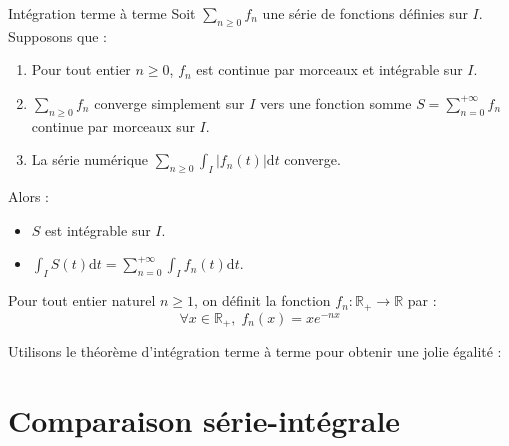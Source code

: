 \documentclass[french,11pt,twoside]{VcCours}
\newcommand{\dt}{\text{d}t}
\newcommand{\Sum}[2]{\sum_{#1}^{#2}}
\begin{document}
\begin{Theoreme}{Intégration terme à terme}
Soit $\Sum{n \geq 0}{} f_n$ une série de fonctions définies sur $I$. Supposons que :
\begin{enumerate}
\item Pour tout entier $n \geq 0$, $f_n$ est continue par morceaux et intégrable sur $I$.
\item $\Sum{n \geq 0}{} f_n$ converge simplement sur $I$ vers une fonction somme $S=\Sum{n=0}{+\infty} f_n$ continue par morceaux sur $I$.
\item La série numérique $ \Sum{n \geq 0}{} \int_{I} \vert f_n(t) \vert \dt$ converge.
\end{enumerate}
Alors :
\begin{itemize}
\item $S$ est intégrable sur $I$.
\item $\int_{I} S(t) \dt =  \Sum{n=0}{+\infty} \int_{I} f_n(t) \dt$.
\end{itemize}
\end{Theoreme}

\begin{Exemple} Pour tout entier naturel $n \geq 1$, on définit la fonction $f_n : \mathbb{R}_+ \rightarrow \mathbb{R}$ par :
$$ \forall x \in \mathbb{R}_+, \; f_n(x)=xe^{-nx}$$

Utilisons le théorème d'intégration terme à terme pour obtenir une jolie égalité :
%

\newpage

\vspace*{5cm}
\end{Exemple}


\section{Comparaison série-intégrale}
\end{document}
